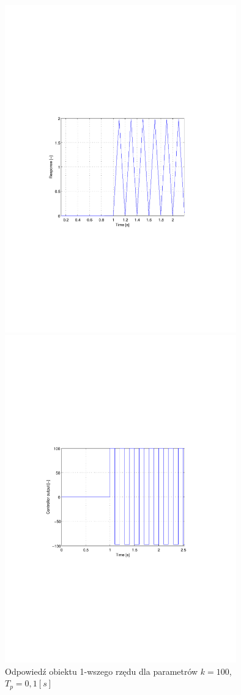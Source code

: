 \documentclass[12pt]{article}
\begin{document}
\newpage

\begin{figure}[!htb]
	\begin{center}
		\includegraphics[trim=5cm 9cm 5cm 9cm,width=10cm]{../res/img/d1_0,1_100y.pdf} 
	\end{center}
	
	\begin{center}
		\includegraphics[trim=5cm 9cm 5cm 9cm,width=10cm]{../res/img/d1_0,1_100u.pdf} 
	\end{center}
	\caption{Odpowiedź obiektu 1-wszego rzędu dla parametrów $k=100$,
	$T_p=0,1[s]$}
\end{figure}
\end{document}
